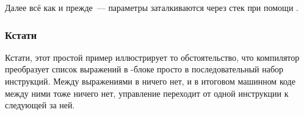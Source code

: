 Далее всё как и прежде~--- параметры заталкиваются через стек при помощи \MOV.
\fi

\subsubsection{Кстати}

Кстати, этот простой пример иллюстрирует то обстоятельство, что компилятор преобразует
список выражений в \CCpp-блоке просто в последовательный набор инструкций.
Между выражениями в \CCpp ничего нет, и в итоговом машинном коде между ними тоже ничего нет, 
управление переходит от одной инструкции к следующей за ней.


